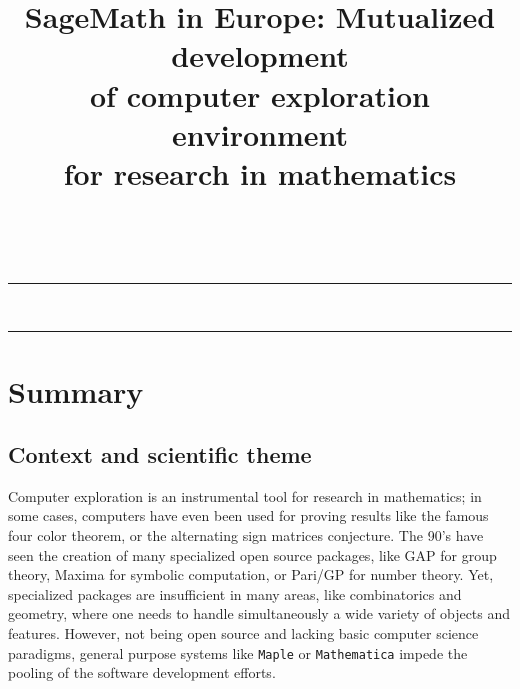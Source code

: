 \documentclass[a4,12pt]{amsart}
\title[SageMath in Europe]{SageMath in Europe: Mutualized development\\
  of computer exploration environment\\
  for research in mathematics
}
\date{}
\newcommand{\sage}{\href{http://www.sagemath.org/}{\texttt{Sage}}\xspace}
\newcommand{\TODO}[2][To do: ]{}
\begin{document}
\ \vspace{-1.5cm}
\hrule
\medskip
\maketitle
\ \vspace{-1cm}
\hrule




\section{Summary}

\subsection{Context and scientific theme}

Computer exploration is an instrumental tool for research in
mathematics; in some cases, computers have even been used for proving
results like the famous four color theorem, or the alternating
sign matrices conjecture.
The 90's have seen the creation of many specialized open source
packages, like GAP for group theory, Maxima for symbolic computation,
or Pari/GP for number theory.  Yet, specialized packages are
insufficient in many areas, like combinatorics and geometry, where one
needs to handle simultaneously a wide variety of objects and features.
However, not being open source and lacking basic computer science
paradigms, general purpose systems like \texttt{Maple} or
\texttt{Mathematica} impede the pooling of the software development
efforts.
\end{document}
